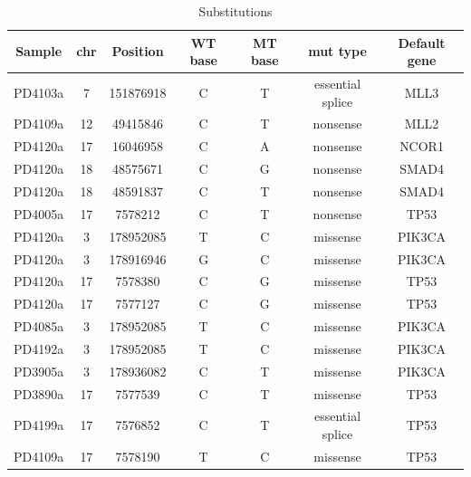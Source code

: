 \documentclass[11pt]{amsart}
\theoremstyle{definition}
\begin{document}
\begin{table}
\begin{center}
\begin{tabular}{ccccccc}%
  {\bf Sample}& {\bf chr} & {\bf Position} & {\bf WT base} & {\bf MT base} &{\bf mut type} & {\bf Default gene}\\ \hline
  PD4103a& 7    &151876918  &   C&  T &                 essential splice& MLL3  \\ %
  PD4109a& 12   &49415846   &   C&  T &                 nonsense& MLL2  \\ %
  PD4120a& 17   &16046958   &   C&  A &                 nonsense& NCOR1 \\ %
  PD4120a& 18   &48575671   &   C&  G &                 nonsense& SMAD4 \\ %
  PD4120a& 18   &48591837   &   C&  T &                 nonsense& SMAD4 \\ %
  PD4005a& 17   &7578212    &   C&  T &                 nonsense& TP53  \\ %
  PD4120a& 3    &178952085  &   T&  C &                 missense& PIK3CA\\ %
  PD4120a& 3    &178916946  &   G&  C &                 missense& PIK3CA\\ %
  PD4120a& 17   &7578380    &   C&  G &                 missense& TP53  \\ %
  PD4120a& 17   &7577127    &   C&  G &                 missense& TP53  \\ %
  PD4085a& 3    &178952085  &   T&  C &                 missense& PIK3CA\\ %
  PD4192a& 3    &178952085  &   T&  C &                 missense& PIK3CA\\ %
  PD3905a& 3    &178936082  &   C&  T &                 missense& PIK3CA\\ %
  PD3890a& 17   &7577539    &   C&  T &                 missense& TP53  \\ %
  PD4199a& 17   &7576852    &   C&  T &                 essential splice& TP53  \\ %
  PD4109a& 17   &7578190    &   T&  C&                  missense& TP53  \\[1em] %
\end{tabular}\caption{Substitutions}\label{tab:tableC} 
\end{center}
\end{table}
\end{document}
